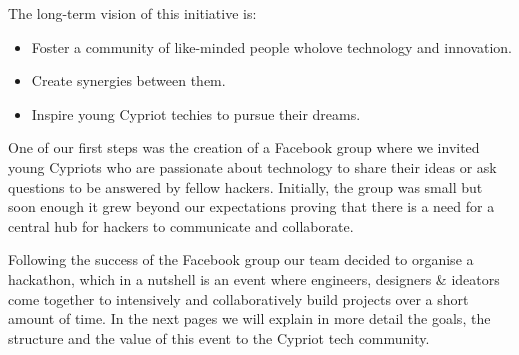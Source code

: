 \documentclass[a4paper,11pt]{report}
\begin{document}
The long-term vision of this initiative is:
\begin{itemize}
  \item Foster a community of like-minded people wholove technology and innovation.
  \item Create synergies between them.
  \item Inspire young Cypriot techies to pursue their dreams.  
\end{itemize}

One of our first steps was the creation of a Facebook group where we invited young Cypriots who are passionate about technology to share their ideas or ask questions to be answered by fellow hackers. Initially, the group was small but soon enough it grew beyond our expectations proving that there is a need for a central hub for hackers to communicate and collaborate.

Following the success of the Facebook group our team decided to organise a hackathon, which in a nutshell is an event where engineers, designers \& ideators come together to intensively and collaboratively build projects over a short amount of time. In the next pages we will explain in more detail the goals, the structure and the value of this event to the Cypriot tech community.
\end{document}
